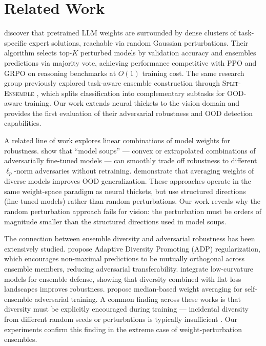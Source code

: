 \section{Related Work}
\label{sec:related}

\citet{gan2026neural} discover that pretrained LLM weights are surrounded by dense clusters of task-specific expert solutions, reachable via random Gaussian perturbations. Their \randopt algorithm selects top-$K$ perturbed models by validation accuracy and ensembles predictions via majority vote, achieving performance competitive with PPO and GRPO on reasoning benchmarks at $O(1)$ training cost. The same research group previously explored task-aware ensemble construction through \textsc{Split-Ensemble} \citep{chen2024split}, which splits classification into complementary subtasks for OOD-aware training. Our work extends neural thickets to the vision domain and provides the first evaluation of their adversarial robustness and OOD detection capabilities.

A related line of work explores linear combinations of model weights for robustness. \citet{croce2023seasoning} show that ``model soups'' --- convex or extrapolated combinations of adversarially fine-tuned models --- can smoothly trade off robustness to different $\ell_p$-norm adversaries without retraining. \citet{rame2022diverse} demonstrate that averaging weights of diverse models improves OOD generalization. These approaches operate in the same weight-space paradigm as neural thickets, but use structured directions (fine-tuned models) rather than random perturbations. Our work reveals why the random perturbation approach fails for vision: the perturbation must be orders of magnitude smaller than the structured directions used in model soups.

The connection between ensemble diversity and adversarial robustness has been extensively studied. \citet{pang2019improving} propose Adaptive Diversity Promoting (ADP) regularization, which encourages non-maximal predictions to be mutually orthogonal across ensemble members, reducing adversarial transferability. \citet{zhao2024ensemble} integrate low-curvature models for ensemble defense, showing that diversity combined with flat loss landscapes improves robustness. \citet{hu2024meat} propose median-based weight averaging for self-ensemble adversarial training. A common finding across these works is that diversity must be explicitly encouraged during training --- incidental diversity from different random seeds or perturbations is typically insufficient \citep{fort2019deep}. Our experiments confirm this finding in the extreme case of weight-perturbation ensembles.

